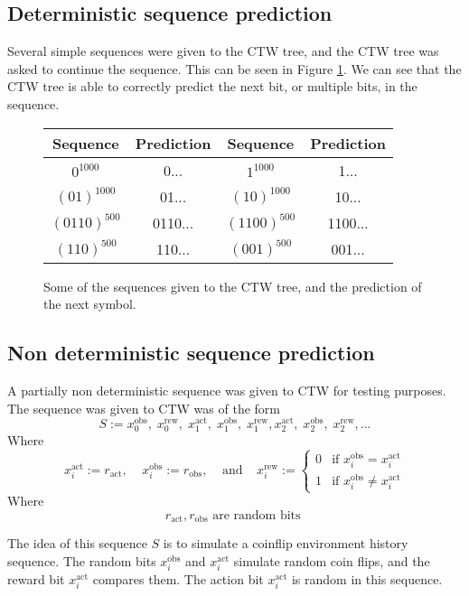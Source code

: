 \documentclass[pdftex,twoside,a4paper]{report}
\newcommand{\bcen}{\begin{center}}
\newcommand{\ecen}{\end{center}}
\begin{document}
\subsection{Deterministic sequence prediction}
Several simple sequences were given to the CTW tree, and the CTW tree was asked to continue the sequence. This can be seen in Figure \ref{tab:det_seq_pred}. We can see that the CTW tree is able to correctly predict the next bit, or multiple bits, in the sequence.

\begin{figure}
\bcen
\bgroup
\def\arraystretch{1.5}
\begin{tabular}{|cc|cc|}
\hline
Sequence & Prediction & Sequence & Prediction\\
\hline $0^{1000}$ & 0... & $1^{1000}$ & 1...\\ 
\hline $(01)^{1000}$ & 01... & $(10)^{1000}$ & 10...\\ 
\hline $(0110)^{500}$ & 0110... & $(1100)^{500}$ & 1100...\\ 
\hline $(110)^{500}$ & 110... & $(001)^{500}$ & 001...\\
\hline 
\end{tabular} 
\egroup
\ecen
\caption{Some of the sequences given to the CTW tree, and the prediction of the next symbol.}
\label{tab:det_seq_pred}
\end{figure}

\subsection{Non deterministic sequence prediction}
A partially non deterministic sequence was given to CTW for testing purposes. The sequence was given to CTW was of the form\\
\[
S := x^{\text{obs}}_0,\; x^{\text{rew}}_0,\; x^{\text{act}}_1,\; x^{\text{obs}}_1,\; x^{\text{rew}}_1, x^{\text{act}}_2,\; x^{\text{obs}}_2,\; x^{\text{rew}}_2, ...
\]
Where\\
\[
x^{\text{act}}_i := r_{\text{act}}, \;\;\;\; x^{\text{obs}}_i := r_{\text{obs}}, \;\;\;\; \text{and} \;\;\;\;
x^{\text{rew}}_i :=
\begin{cases}
0 & \text{if } x^{\text{obs}}_i = x^{\text{act}}_i\\
1 & \text{if } x^{\text{obs}}_i \not= x^{\text{act}}_i
\end{cases}
\]
Where\\
\[
r_\text{act}, r_\text{obs} \text{ are random bits }
\]

The idea of this sequence $S$ is to simulate a coinflip environment history sequence. The random bits $x^{\text{obs}}_i$ and $x^{\text{act}}_i$ simulate random coin flips, and the reward bit $x^{\text{act}}_i$ compares them. The action bit $x^{\text{act}}_i$ is random in this sequence.
\end{document}
